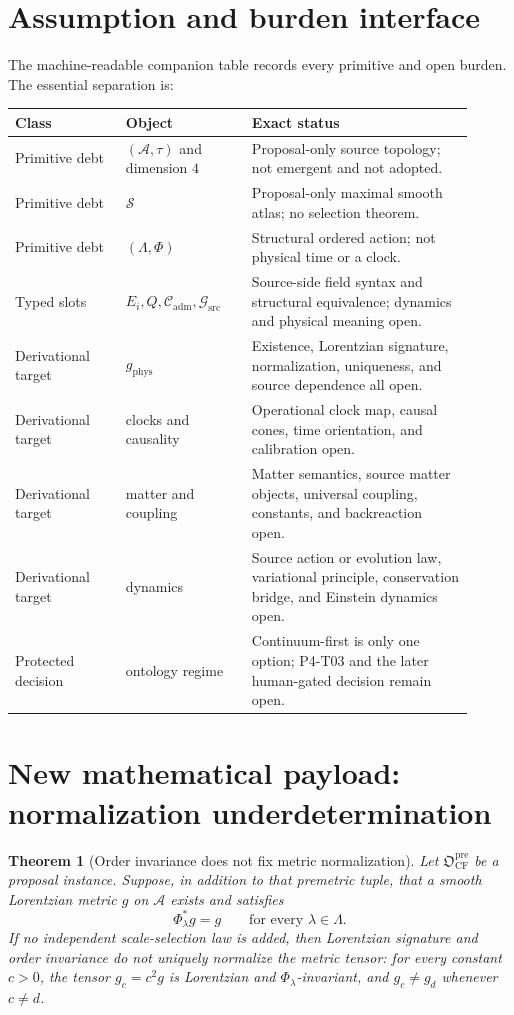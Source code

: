 \documentclass[11pt]{article}
\newtheorem{theorem}{Theorem}
\newcommand{\A}{\mathcal A}
\newcommand{\C}{\mathcal C}
\newcommand{\G}{\mathcal G}
\begin{document}
\section{Assumption and burden interface}

The machine-readable companion table records every primitive and open burden.
The essential separation is:
\begin{longtable}{p{0.22\linewidth}p{0.25\linewidth}p{0.44\linewidth}}
\toprule
Class & Object & Exact status \\
\midrule
\endhead
Primitive debt & $(\A,\tau)$ and dimension $4$ & Proposal-only source topology;
not emergent and not adopted. \\
Primitive debt & $\mathcal S$ & Proposal-only maximal smooth atlas; no
selection theorem. \\
Primitive debt & $(\Lambda,\Phi)$ & Structural ordered action; not physical
time or a clock. \\
Typed slots & $E_i,Q,\C_{\mathrm{adm}},\G_{\mathrm{src}}$ & Source-side
field syntax and structural equivalence; dynamics and physical meaning open. \\
Derivational target & $g_{\mathrm{phys}}$ & Existence, Lorentzian signature,
normalization, uniqueness, and source dependence all open. \\
Derivational target & clocks and causality & Operational clock map, causal
cones, time orientation, and calibration open. \\
Derivational target & matter and coupling & Matter semantics, source matter
objects, universal coupling, constants, and backreaction open. \\
Derivational target & dynamics & Source action or evolution law, variational
principle, conservation bridge, and Einstein dynamics open. \\
Protected decision & ontology regime & Continuum-first is only one option;
P4-T03 and the later human-gated decision remain open. \\
\bottomrule
\end{longtable}

\section{New mathematical payload: normalization underdetermination}

\begin{theorem}[Order invariance does not fix metric normalization]
Let $\mathfrak O_{\mathrm{CF}}^{\mathrm{pre}}$ be a proposal instance. Suppose,
in addition to that premetric tuple, that a smooth Lorentzian metric $g$ on
$\A$ exists and satisfies
\[
   \Phi_\lambda^{*}g=g\qquad\text{for every }\lambda\in\Lambda.
\]
If no independent scale-selection law is added, then Lorentzian signature and
order invariance do not uniquely normalize the metric tensor: for every
constant $c>0$, the tensor $g_c=c^2g$ is Lorentzian and
$\Phi_\lambda$-invariant, and $g_c\ne g_d$ whenever $c\ne d$.
\end{theorem}
\end{document}
